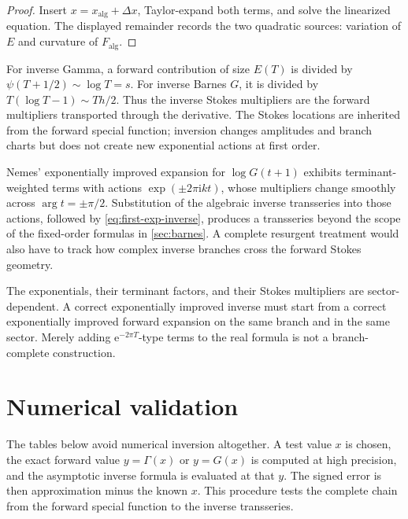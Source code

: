 \documentclass[11pt]{article}
\theoremstyle{definition}
\theoremstyle{remark}
\newcommand{\e}{\mathrm e}
\newcommand{\ii}{\mathrm i}
\begin{document}
\begin{proof}
Insert \(x=x_{\mathrm{alg}}+\Delta x\), Taylor-expand both terms, and solve the linearized equation.  The displayed remainder records the two quadratic sources: variation of \(E\) and curvature of \(F_{\mathrm{alg}}\).
\end{proof}

For inverse Gamma, a forward contribution of size \(E(T)\) is divided by
\(\psi(T+1/2)\sim\log T=s\).  For inverse Barnes \(G\), it is divided by
\(T(\log T-1)\sim Th/2\).  Thus the inverse Stokes multipliers are the forward multipliers transported through the derivative.  The Stokes locations are inherited from the forward special function; inversion changes amplitudes and branch charts but does not create new exponential actions at first order.

Nemes' exponentially improved expansion for \(\log G(t+1)\) \cite{NemesBarnes} exhibits terminant-weighted terms with actions \(\exp(\pm2\pi\ii k t)\), whose multipliers change smoothly across \(\arg t=\pm\pi/2\).  Substitution of the algebraic inverse transseries into those actions, followed by \cref{eq:first-exp-inverse}, produces a transseries beyond the scope of the fixed-order formulas in \cref{sec:barnes}.  A complete resurgent treatment would also have to track how complex inverse branches cross the forward Stokes geometry.

\begin{warningbox}
The exponentials, their terminant factors, and their Stokes multipliers are sector-dependent.  A correct exponentially improved inverse must start from a correct exponentially improved forward expansion on the same branch and in the same sector.  Merely adding \(\e^{-2\pi T}\)-type terms to the real formula is not a branch-complete construction.
\end{warningbox}

\section{Numerical validation}\label{sec:numerics}

The tables below avoid numerical inversion altogether.  A test value \(x\) is chosen, the exact forward value \(y=\Gamma(x)\) or \(y=G(x)\) is computed at high precision, and the asymptotic inverse formula is evaluated at that \(y\).  The signed error is then approximation minus the known \(x\).  This procedure tests the complete chain from the forward special function to the inverse transseries.
\end{document}
